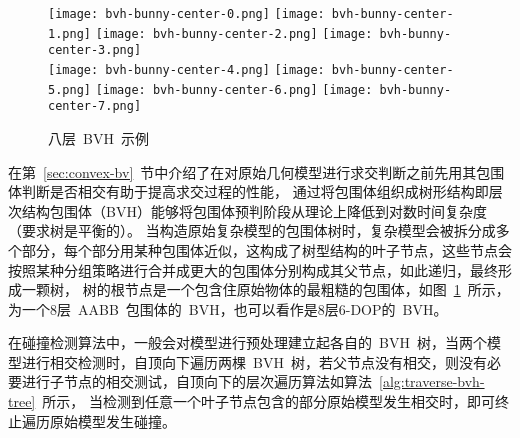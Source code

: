 \begin{figure}[H]
  \centering
  \subcaptionbox*{\label{lbl:bvh-bunny-center-0.png}}
    {\texttt{[image: bvh-bunny-center-0.png]}}
  \subcaptionbox*{\label{lbl:bvh-bunny-center-1.png}}
    {\texttt{[image: bvh-bunny-center-1.png]}}
  \subcaptionbox*{\label{lbl:bvh-bunny-center-2.png}}
    {\texttt{[image: bvh-bunny-center-2.png]}}
  \subcaptionbox*{\label{lbl:bvh-bunny-center-3.png}}
    {\texttt{[image: bvh-bunny-center-3.png]}}
    \vspace{-0.3cm}
  \\\hspace{0.5cm} 
  \subcaptionbox*{\label{lbl:bvh-bunny-center-4.png}}
    {\texttt{[image: bvh-bunny-center-4.png]}}
  \subcaptionbox*{\label{lbl:bvh-bunny-center-5.png}}
    {\texttt{[image: bvh-bunny-center-5.png]}}
  \subcaptionbox*{\label{lbl:bvh-bunny-center-6.png}}
    {\texttt{[image: bvh-bunny-center-6.png]}}
  \subcaptionbox*{\label{lbl:bvh-bunny-center-7.png}}
    {\texttt{[image: bvh-bunny-center-7.png]}}
\caption{八层~BVH~示例}
\label{lbl:bvh-example}
\end{figure}
在第~\ref{sec:convex-bv}~节中介绍了在对原始几何模型进行求交判断之前先用其包围体判断是否相交有助于提高求交过程的性能，
通过将包围体组织成树形结构即层次结构包围体（BVH）能够将包围体预判阶段从理论上降低到对数时间复杂度（要求树是平衡的）。
当构造原始复杂模型的包围体树时，复杂模型会被拆分成多个部分，每个部分用某种包围体近似，这构成了树型结构的叶子节点，这些节点会按照某种分组策略进行合并成更大的包围体分别构成其父节点，如此递归，最终形成一颗树，
树的根节点是一个包含住原始物体的最粗糙的包围体，如图~\ref{lbl:bvh-example}~所示，为一个8层~AABB~包围体的~BVH，也可以看作是8层6-DOP的~BVH。

在碰撞检测算法中，一般会对模型进行预处理建立起各自的~BVH~树，当两个模型进行相交检测时，自顶向下遍历两棵~BVH~树，若父节点没有相交，则没有必要进行子节点的相交测试，自顶向下的层次遍历算法如算法~\ref{alg:traverse-bvh-tree}~所示，
当检测到任意一个叶子节点包含的部分原始模型发生相交时，即可终止遍历原始模型发生碰撞。

